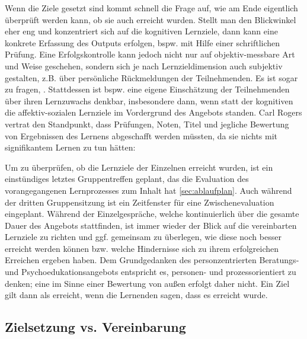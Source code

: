 \documentclass[
  twoside,
  parskip=half-,
  paper=176mm:246mm,
  BCOR=14mm,
  DIV=14,
]{scrreprt}
\begin{document}
Wenn die Ziele gesetzt sind kommt schnell die Frage auf, wie am Ende eigentlich überprüft werden kann, ob sie auch erreicht wurden. Stellt man den Blickwinkel eher eng und konzentriert sich auf die kognitiven Lernziele, dann kann eine konkrete Erfassung des Outputs erfolgen, bspw. mit Hilfe einer schriftlichen Prüfung. Eine Erfolgskontrolle kann jedoch nicht nur auf objektiv-messbare Art und Weise geschehen, sondern sich je nach Lernzieldimension auch subjektiv gestalten, z.B. über persönliche Rückmeldungen der Teilnehmenden. Es ist sogar zu fragen, . Stattdessen ist bspw. eine eigene Einschätzung der Teilnehmenden über ihren Lernzuwachs denkbar, insbesondere dann, wenn statt der kognitiven die affektiv-sozialen Lernziele im Vordergrund des Angebots standen. Carl Rogers vertrat den Standpunkt, dass Prüfungen, Noten, Titel und jegliche Bewertung von Ergebnissen des Lernens abgeschafft werden müssten, da sie nichts mit signifikantem Lernen zu tun hätten: 


\begin{praxis}
  Um zu überprüfen, ob die Lernziele der Einzelnen erreicht wurden, ist ein einstündiges letztes Gruppentreffen geplant, das die Evaluation des vorangegangenen Lernprozesses zum Inhalt hat \autoref{sec:ablaufplan}. Auch während der dritten Gruppensitzung ist ein Zeitfenster für eine Zwischenevaluation eingeplant. Während der Einzelgespräche, welche kontinuierlich über die gesamte Dauer des Angebots stattfinden, ist immer wieder der Blick auf die vereinbarten Lernziele zu richten und ggf. gemeinsam zu überlegen, wie diese noch besser erreicht werden können bzw. welche Hindernisse sich zu ihrem erfolgreichen Erreichen ergeben haben. Dem Grundgedanken des personzentrierten Beratungs- und Psychoedukationsangebots entspricht es, personen- und prozessorientiert zu denken; eine  im Sinne einer Bewertung von außen erfolgt daher nicht. Ein Ziel gilt dann als erreicht, wenn die Lernenden sagen, dass es erreicht wurde.
\end{praxis}



\subsection{Zielsetzung vs. Vereinbarung}
\end{document}
